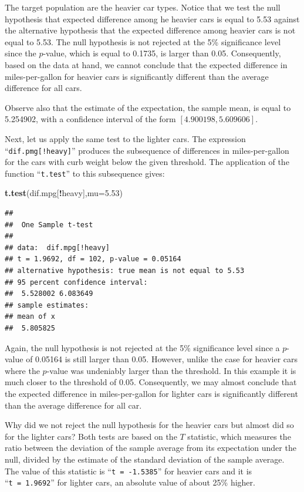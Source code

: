 \documentclass[
]{krantz}
\makeatletter
\newenvironment{Shaded}{\begin{snugshade}}{\end{snugshade}}
\newcommand{\DataTypeTok}[1]{\textcolor[rgb]{0.13,0.29,0.53}{#1}}
\newcommand{\FloatTok}[1]{\textcolor[rgb]{0.00,0.00,0.81}{#1}}
\newcommand{\KeywordTok}[1]{\textcolor[rgb]{0.13,0.29,0.53}{\textbf{#1}}}
\newcommand{\NormalTok}[1]{#1}
\newcommand{\OperatorTok}[1]{\textcolor[rgb]{0.81,0.36,0.00}{\textbf{#1}}}
\newenvironment{kframe}{%
\medskip{}
\setlength{\fboxsep}{.8em}
 \def\at@end@of@kframe{}%
 \ifinner\ifhmode%
  \def\at@end@of@kframe{\end{minipage}}%
  \begin{minipage}{\columnwidth}%
 \fi\fi%
 \def\FrameCommand##1{\hskip\@totalleftmargin \hskip-\fboxsep
 \colorbox{shadecolor}{##1}\hskip-\fboxsep
     \hskip-\linewidth \hskip-\@totalleftmargin \hskip\columnwidth}%
 \MakeFramed {\advance\hsize-\width
   \@totalleftmargin\z@ \linewidth\hsize
   \@setminipage}}%
 {\par\unskip\endMakeFramed%
 \at@end@of@kframe}
\renewenvironment{Shaded}{\begin{kframe}}{\end{kframe}}
\theoremstyle{definition}
\theoremstyle{definition}
\theoremstyle{definition}
\theoremstyle{remark}
\makeatother
\begin{document}
The target population are the heavier car types. Notice that we test the
null hypothesis that expected difference among he heavier cars is equal
to 5.53 against the alternative hypothesis that the expected difference
among heavier cars is not equal to 5.53. The null hypothesis is not
rejected at the 5\% significance level since the \(p\)-value, which is
equal to 0.1735, is larger than 0.05. Consequently, based on the data at
hand, we cannot conclude that the expected difference in
miles-per-gallon for heavier cars is significantly different than the
average difference for all cars.

Observe also that the estimate of the expectation, the sample mean, is
equal to 5.254902, with a confidence interval of the form
\([4.900198, 5.609606]\).

Next, let us apply the same test to the lighter cars. The expression
``\texttt{dif.pmg{[}!heavy{]}}'' produces the subsequence of differences in
miles-per-gallon for the cars with curb weight below the given
threshold. The application of the function ``\texttt{t.test}'' to this
subsequence gives:

\begin{Shaded}
\begin{Highlighting}[]
\KeywordTok{t.test}\NormalTok{(dif.mpg[}\OperatorTok{!}\NormalTok{heavy],}\DataTypeTok{mu=}\FloatTok{5.53}\NormalTok{)}
\end{Highlighting}
\end{Shaded}

\begin{verbatim}
## 
##  One Sample t-test
## 
## data:  dif.mpg[!heavy]
## t = 1.9692, df = 102, p-value = 0.05164
## alternative hypothesis: true mean is not equal to 5.53
## 95 percent confidence interval:
##  5.528002 6.083649
## sample estimates:
## mean of x 
##  5.805825
\end{verbatim}

Again, the null hypothesis is not rejected at the 5\% significance level
since a \(p\)-value of 0.05164 is still larger than 0.05. However, unlike
the case for heavier cars where the \(p\)-value was undeniably larger than
the threshold. In this example it is much closer to the threshold of
0.05. Consequently, we may almost conclude that the expected difference
in miles-per-gallon for lighter cars is significantly different than the
average difference for all car.

Why did we not reject the null hypothesis for the heavier cars but
almost did so for the lighter cars? Both tests are based on the \(T\)
statistic, which measures the ratio between the deviation of the sample
average from its expectation under the null, divided by the estimate of
the standard deviation of the sample average. The value of this
statistic is ``\texttt{t\ =\ -1.5385}'' for heavier cars and it is ``\texttt{t\ =\ 1.9692}''
for lighter cars, an absolute value of about 25\% higher.
\end{document}
